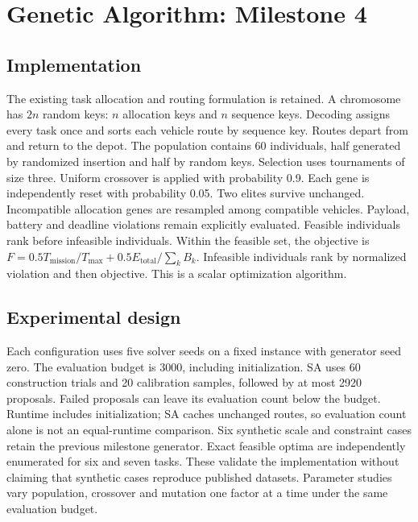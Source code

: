 \chapter{Genetic Algorithm: Milestone 4}
\section{Implementation}
The existing task allocation and routing formulation is retained. A chromosome has $2n$ random keys: $n$ allocation keys and $n$ sequence keys. Decoding assigns every task once and sorts each vehicle route by sequence key. Routes depart from and return to the depot.
The population contains 60 individuals, half generated by randomized insertion and half by random keys. Selection uses tournaments of size three. Uniform crossover is applied with probability 0.9. Each gene is independently reset with probability 0.05. Two elites survive unchanged. Incompatible allocation genes are resampled among compatible vehicles. Payload, battery and deadline violations remain explicitly evaluated.
Feasible individuals rank before infeasible individuals. Within the feasible set, the objective is $F=0.5T_{\mathrm{mission}}/T_{\max}+0.5E_{\mathrm{total}}/\sum_k B_k$. Infeasible individuals rank by normalized violation and then objective. This is a scalar optimization algorithm.
\section{Experimental design}
Each configuration uses five solver seeds on a fixed instance with generator seed zero. The evaluation budget is 3000, including initialization. SA uses 60 construction trials and 20 calibration samples, followed by at most 2920 proposals. Failed proposals can leave its evaluation count below the budget. Runtime includes initialization; SA caches unchanged routes, so evaluation count alone is not an equal-runtime comparison.
Six synthetic scale and constraint cases retain the previous milestone generator. Exact feasible optima are independently enumerated for six and seven tasks. These validate the implementation without claiming that synthetic cases reproduce published datasets. Parameter studies vary population, crossover and mutation one factor at a time under the same evaluation budget.
